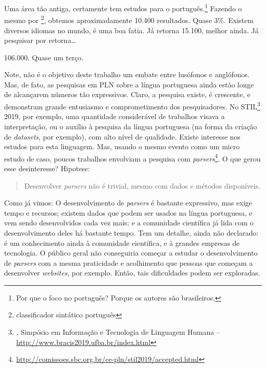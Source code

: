 Uma área tão antiga, certamente tem estudos para o português.\footnote{Por que o foco no português? Porque os autores são brasileiros.} Fazendo o mesmo  por \footnote{classificador sintático português}, obtemos aproximadamente 10.400 resultados. Quase 3\%.
Existem diversos idiomas no mundo, é uma boa fatia.
Já  retorna 15.100, melhor ainda. Já pesquisar por   retorna\ldots

106.000. Quase um terço.

Note, não é o objetivo deste trabalho um embate entre lusófonos e anglófonos. Mas, de fato, as pesquisas em PLN sobre a língua portuguesa ainda estão longe de alcançarem números tão expressivos. Claro, a pesquisa existe, é crescente, e demonstram grande entusiasmo e comprometimento dos pesquisadores. No STIL\footnote{, Simpósio em Informação e Tecnologia de Linguagem Humana --  \url{http://www.bracis2019.ufba.br/index.html}} 2019, por exemplo, uma quantidade considerável de trabalhos visava a interpretação, ou o auxílio à pesquisa da língua portuguesa (na forma da criação de \textit{datasets}, por exemplo), com alto nível de qualidade. Existe interesse nos estudos para esta linguagem. Mas, usando o mesmo evento como um micro estudo de caso, poucos trabalhos envolviam a pesquisa com \textit{parsers}\footnote{\url{http://comissoes.sbc.org.br/ce-pln/stil2019/accepted.html}}. O que gerou esse desinteresse? Hipotese:
\begin{quote}
    Desenvolver \textit{parsers} não é trivial, mesmo com dados e métodos disponíveis.
\end{quote}
Como já vimos: O desenvolvimento de \textit{parsers} é bastante expressivo, mas exige tempo e recursos; existem dados que podem ser usados na língua portuguesa, e vem sendo desenvolvidos cada vez mais; e a comunidade científica já lida com o desenvolvimento deles há bastante tempo. Tem um detalhe, ainda não declarado: é um conhecimento ainda  à comunidade científica, e à grandes empresas de tecnologia. O público geral não conseguiria começar a estudar o desenvolvimento de \textit{parsers} com a mesma praticidade e acolhimento que pessoas que começam a desenvolver \textit{websites}, por exemplo. Então, tais dificuldades podem ser exploradas.

